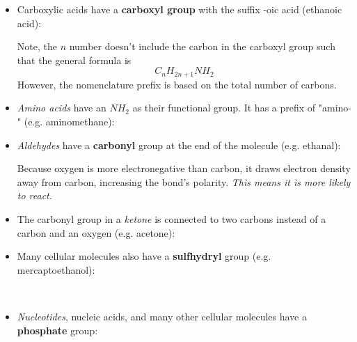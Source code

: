 \documentclass[letterpaper]{article}
\begin{document}
\begin{itemize}
    \item Carboxylic acids have a \textbf{carboxyl group} with the suffix -oic acid (ethanoic acid): \label{sec:carboxylic}
    \begin{center}
    \end{center}
    \begin{tip}
    Note, the $n$ number doesn't include the carbon in the carboxyl group such that the general formula is
    $$C_nH_{2n+1}NH_2$$
    However, the nomenclature prefix is based on the total number of carbons.
    \end{tip}
    \item \textit{Amino acids} have an $NH_2$ as their functional group. It has a prefix of "amino-" (e.g. aminomethane):
    \begin{center}
    \end{center}

    \item \textit{Aldehydes} have a \textbf{carbonyl} group at the end of the molecule (e.g. ethanal):
    \begin{center}
    \end{center}
    
    Because oxygen is more electronegative than carbon, it draws electron density away from carbon, increasing the bond's polarity. \textit{This means it is more likely to react.}
    \item The carbonyl group in a \textit{ketone} is connected to two carbons instead of a carbon and an oxygen (e.g. acetone):
    \begin{center}
    \end{center}
    \item Many cellular molecules also have a \textbf{sulfhydryl}  group (e.g. mercaptoethanol):
    \begin{center}
         \\
    \end{center}
    \item \textit{Nucleotides}, nucleic acids, and many other cellular molecules have a \textbf{phosphate} group:
    \begin{center}
    \end{center}

\end{itemize}
\end{document}
